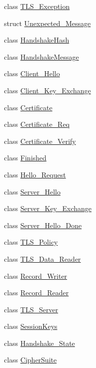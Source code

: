 \begin{DoxyCompactItemize}
\item 
class \hyperlink{classBotan_1_1TLS__Exception}{T\-L\-S\-\_\-\-Exception}
\item 
struct \hyperlink{structBotan_1_1Unexpected__Message}{Unexpected\-\_\-\-Message}
\item 
class \hyperlink{classBotan_1_1HandshakeHash}{Handshake\-Hash}
\item 
class \hyperlink{classBotan_1_1HandshakeMessage}{Handshake\-Message}
\item 
class \hyperlink{classBotan_1_1Client__Hello}{Client\-\_\-\-Hello}
\item 
class \hyperlink{classBotan_1_1Client__Key__Exchange}{Client\-\_\-\-Key\-\_\-\-Exchange}
\item 
class \hyperlink{classBotan_1_1Certificate}{Certificate}
\item 
class \hyperlink{classBotan_1_1Certificate__Req}{Certificate\-\_\-\-Req}
\item 
class \hyperlink{classBotan_1_1Certificate__Verify}{Certificate\-\_\-\-Verify}
\item 
class \hyperlink{classBotan_1_1Finished}{Finished}
\item 
class \hyperlink{classBotan_1_1Hello__Request}{Hello\-\_\-\-Request}
\item 
class \hyperlink{classBotan_1_1Server__Hello}{Server\-\_\-\-Hello}
\item 
class \hyperlink{classBotan_1_1Server__Key__Exchange}{Server\-\_\-\-Key\-\_\-\-Exchange}
\item 
class \hyperlink{classBotan_1_1Server__Hello__Done}{Server\-\_\-\-Hello\-\_\-\-Done}
\item 
class \hyperlink{classBotan_1_1TLS__Policy}{T\-L\-S\-\_\-\-Policy}
\item 
class \hyperlink{classBotan_1_1TLS__Data__Reader}{T\-L\-S\-\_\-\-Data\-\_\-\-Reader}
\item 
class \hyperlink{classBotan_1_1Record__Writer}{Record\-\_\-\-Writer}
\item 
class \hyperlink{classBotan_1_1Record__Reader}{Record\-\_\-\-Reader}
\item 
class \hyperlink{classBotan_1_1TLS__Server}{T\-L\-S\-\_\-\-Server}
\item 
class \hyperlink{classBotan_1_1SessionKeys}{Session\-Keys}
\item 
class \hyperlink{classBotan_1_1Handshake__State}{Handshake\-\_\-\-State}
\item 
class \hyperlink{classBotan_1_1CipherSuite}{Cipher\-Suite}
\item 

\end{DoxyCompactItemize}
